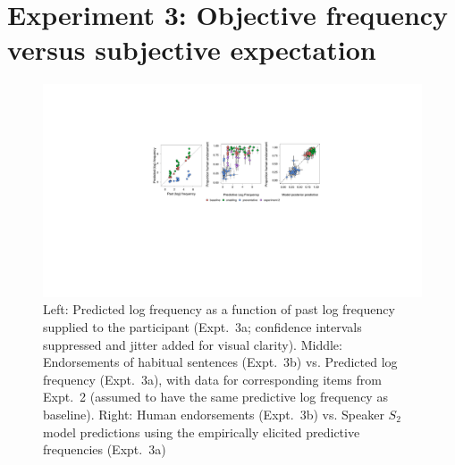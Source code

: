 \documentclass[10pt,letterpaper]{article}
\begin{document}
\section{Experiment 3: Objective frequency versus subjective expectation}

\begin{figure}[tb]
\centering
  \includegraphics[width=\textwidth]{expt3-4-scatters-2.pdf}
  \caption{Left: Predicted log frequency as a function of past log frequency supplied to the participant (Expt.~3a; confidence intervals suppressed and jitter added for visual clarity).
  Middle: Endorsements of habitual sentences (Expt.~3b) vs. Predicted log frequency (Expt.~3a), with data for corresponding items from Expt.~2 (assumed to have the same predictive log frequency as baseline). 
  Right: Human endorsements (Expt.~3b) vs. Speaker $S_2$ model predictions using the empirically elicited predictive frequencies (Expt.~3a)}
  \label{fig:tj3}
\end{figure}

\end{document}
